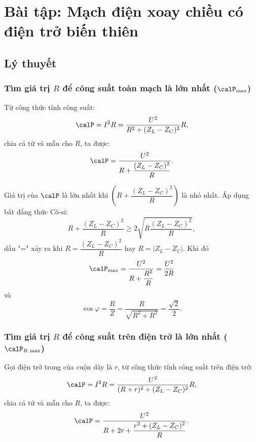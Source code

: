 
\chapter[Bài tập: Mạch điện xoay chiều có điện trở biến thiên]{Bài tập: Mạch điện xoay chiều có điện trở biến thiên}
\section{Lý thuyết}
\subsection{Tìm giá trị $R$ để công suất toàn mạch là lớn nhất ($\calP_\text{max}$)}
Từ công thức tính công suất:
\begin{equation*}
	\calP = I^2 R = \dfrac{U^2}{R^2 + (Z_L - Z_C)^2}R,
\end{equation*}
chia cả tử và mẫu cho $R$, ta được:
\begin{equation*}
	\calP = \dfrac{U^2}{R+\dfrac{(Z_L-Z_C)^2}{R}}.
\end{equation*}

Giá trị của $\calP$ là lớn nhất khi $\left(R+\dfrac{(Z_L - Z_C)^2}{R}\right)$ là nhỏ nhất. Áp dụng bất đẳng thức Cô-si:
\begin{equation*}
	R+\dfrac{(Z_L - Z_C)^2}{R} \geq 2\sqrt{R\dfrac{(Z_L - Z_C)^2}{R}},
\end{equation*}
dấu "=" xảy ra khi $R=\dfrac{(Z_L - Z_C)^2}{R}$ hay $R=|Z_L - Z_C|$.
Khi đó
\begin{equation*}
	\calP_\text{max} = \dfrac{U^2}{R+\dfrac{R^2}{R}}=\dfrac{U^2}{2R}
\end{equation*}
và
\begin{equation*}
	\cos \varphi = \dfrac{R}{Z}=\dfrac{R}{\sqrt{R^2 + R^2}} = \dfrac{\sqrt 2}{2}.
\end{equation*}
\subsection{Tìm giá trị $R$ để công suất trên điện trở là lớn nhất ($\calP_{R\ \text{max}}$)}

Gọi điện trở trong của cuộn dây là $r$, từ công thức tính công suất trên điện trở:
\begin{equation*}
	\calP = I^2 R = \dfrac{U^2}{(R+r)^2 + (Z_L - Z_C)^2}R,
\end{equation*}
chia cả tử và mẫu cho $R$, ta được:
\begin{equation*}
	\calP = \dfrac{U^2}{R+2r+\dfrac{r^2+(Z_L-Z_C)^2}{R}}.
\end{equation*}

